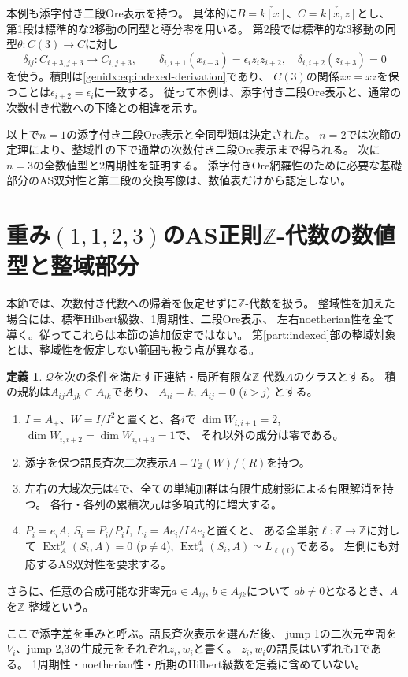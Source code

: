\documentclass[11pt,a4paper]{ltjsarticle}
\theoremstyle{definition}
\newtheorem{definition}[theorem]{定義}
\newcommand{\Ext}{\operatorname{Ext}}
\begin{document}
本例も添字付き二段Ore表示を持つ。
具体的に$B=\check{k[x]}$、$C=\check{k[x,z]}$とし、
第1段は標準的な2移動の同型と導分零を用いる。
第2段では標準的な3移動の同型$\theta:C(3)\to C$に対し
\[
\delta_{ij}:C_{i+3,j+3}\to C_{i,j+3},\qquad
\delta_{i,i+1}(x_{i+3})=\epsilon_i z_i z_{i+2},\quad
\delta_{i,i+2}(z_{i+3})=0
\]
を使う。積則は\eqref{genidx:eq:indexed-derivation}であり、
$C(3)$の関係$zx=xz$を保つことは$\epsilon_{i+2}=\epsilon_i$に一致する。
従って本例は、添字付き二段Ore表示と、通常の次数付き代数への下降との相違を示す。

以上で$n=1$の添字付き二段Ore表示と全同型類は決定された。
$n=2$では次節の定理により、整域性の下で通常の次数付き二段Ore表示まで得られる。
次に$n=3$の全数値型と2周期性を証明する。
添字付きOre網羅性のために必要な基礎部分のAS双対性と第二段の交換写像は、数値表だけから認定しない。

\section{重み\texorpdfstring{$(1,1,2,3)$}{(1,1,2,3)}のAS正則\texorpdfstring{$\mathbb Z$}{Z}-代数の数値型と整域部分}\label{idx:sec:domain}
本節では、次数付き代数への帰着を仮定せずに$\mathbb Z$-代数を扱う。
整域性を加えた場合には、標準Hilbert級数、1周期性、二段Ore表示、
左右noetherian性を全て導く。従ってこれらは本節の追加仮定ではない。
第\ref{part:indexed}部の整域対象とは、整域性を仮定しない範囲も扱う点が異なる。

\begin{definition}\label{idx:def:target}
$\mathcal Q$を次の条件を満たす正連結・局所有限な$\mathbb Z$-代数$A$のクラスとする。
積の規約は$A_{ij}A_{jk}\subset A_{ik}$であり、
$A_{ii}=k$, $A_{ij}=0$ ($i>j$) とする。
\begin{enumerate}
\item $I=A_+$、$W=I/I^2$と置くと、各$i$で
$\dim W_{i,i+1}=2$, $\dim W_{i,i+2}=\dim W_{i,i+3}=1$で、
それ以外の成分は零である。
\item 添字を保つ語長斉次二次表示$A=T_{\mathbb Z}(W)/(R)$を持つ。
\item 左右の大域次元は4で、全ての単純加群は有限生成射影による有限解消を持つ。
各行・各列の累積次元は多項式的に増大する。
\item $P_i=e_iA$, $S_i=P_i/P_iI$, $L_i=Ae_i/IAe_i$と置くと、
ある全単射$\ell:\mathbb Z\to\mathbb Z$に対して
$\Ext_A^p(S_i,A)=0$ ($p\ne4$), $\Ext_A^4(S_i,A)\simeq L_{\ell(i)}$である。
左側にも対応するAS双対性を要求する。
\end{enumerate}
さらに、任意の合成可能な非零元$a\in A_{ij}$, $b\in A_{jk}$について
$ab\ne0$となるとき、$A$を$\mathbb Z$-整域という。
\end{definition}
ここで添字差を重みと呼ぶ。語長斉次表示を選んだ後、
jump 1の二次元空間を$V_i$、jump 2,3の生成元をそれぞれ$z_i,w_i$と書く。
$z_i,w_i$の語長はいずれも1である。
1周期性・noetherian性・所期のHilbert級数を定義に含めていない。
\end{document}
